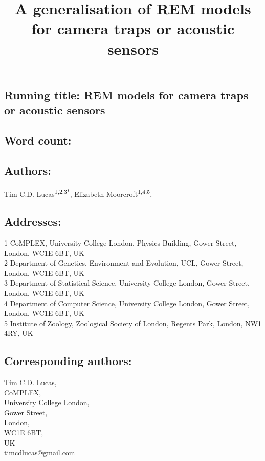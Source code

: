 \documentclass[a4paper,10pt,reqno,oneside]{amsart}
\begin{document}
\title{A generalisation of REM models for camera traps or acoustic sensors}
\maketitle

\subsection*{ Running title: REM models for camera traps or acoustic sensors}

\subsection*{ Word count:}

\subsection*{ Authors:\\}
Tim C.D. Lucas\textsuperscript{1,2,3*}, Elizabeth Moorcroft\textsuperscript{1,4,5}, %


\subsection*{ Addresses:\\}
1 CoMPLEX, University College London, Physics Building, Gower Street, London, WC1E 6BT, UK\\ 
2 Department of Genetics, Environment and Evolution, UCL, Gower Street, London, WC1E 6BT, UK\\ 
3 Department of Statistical Science, University College London, Gower Street, London, WC1E 6BT, UK\\ 
4 Department of Computer Science, University College London, Gower Street, London, WC1E 6BT, UK\\ 
5 Institute of Zoology, Zoological Society of London, Regents Park, London, NW1 4RY, UK


\subsection*{ Corresponding authors:\\}
Tim C.D. Lucas,\\
CoMPLEX,\\
University College London,\\
Gower Street,\\
London,\\
WC1E 6BT, \\
UK\\
timcdlucas@gmail.com\\
\end{document}
